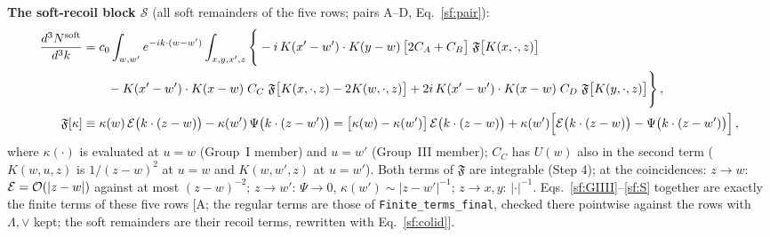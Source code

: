 \noindent\textbf{The soft-recoil block $\mathcal{S}$} (all soft remainders of the five rows; pairs A--D, Eq.~\eqref{sf:pair}):
\begin{align}
\frac{d^{3}N^{\rm soft}}{d^{3}k}&=c_{0}\int_{w,w'}e^{-ik\cdot(w-w')}\int_{x,y,x',z}\Bigg\{-i\,K(x'-w')\cdot K(y-w)\,\big[2C_{A}+C_{B}\big]\;\mathfrak{F}\big[K(x,\cdot,z)\big]\notag\\
&\qquad-K(x'-w')\cdot K(x-w)\;C_{C}\;\mathfrak{F}\big[K(x,\cdot,z)-2K(w,\cdot,z)\big]+2i\,K(x'-w')\cdot K(x-w)\;C_{D}\;\mathfrak{F}\big[K(y,\cdot,z)\big]\Bigg\}\,,\label{sf:S}\\
\mathfrak{F}[\kappa]&\equiv\kappa(w)\,\mathcal{E}\big(k\cdot(z-w)\big)-\kappa(w')\,\Psi\big(k\cdot(z-w')\big)=\big[\kappa(w)-\kappa(w')\big]\,\mathcal{E}\big(k\cdot(z-w)\big)+\kappa(w')\Big[\mathcal{E}\big(k\cdot(z-w)\big)-\Psi\big(k\cdot(z-w')\big)\Big]\,,\notag
\end{align}
where $\kappa(\cdot)$ is evaluated at $u=w$ (Group~I member) and $u=w'$ (Group~III member); $C_{C}$ has $U(w)$ also in the second term ($K(w,u,z)$ is $1/(z-w)^{2}$ at $u=w$ and $K(w,w',z)$ at $u=w'$). Both terms of $\mathfrak{F}$ are integrable (Step 4); at the coincidences: $z\to w$: $\mathcal{E}={\cal O}(|z-w|)$ against at most $(z-w)^{-2}$; $z\to w'$: $\Psi\to0$, $\kappa(w')\sim|z-w'|^{-1}$; $z\to x,y$: $|\cdot|^{-1}$. Eqs.~\eqref{sf:GIIII}--\eqref{sf:S} together are exactly the finite terms of these five rows [A; the regular terms are those of \texttt{Finite\_terms\_final}, checked there pointwise against the rows with $\Lambda,\vee$ kept; the soft remainders are their recoil terms, rewritten with Eq.~\eqref{sf:colid}].

